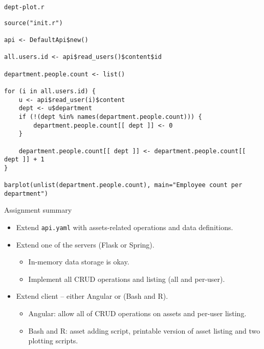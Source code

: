 \begin{frame}[fragile]{\texttt{dept-plot.r}}
\begin{lstlisting}[style=mini]
source("init.r")

api <- DefaultApi$new()

all.users.id <- api$read_users()$content$id

department.people.count <- list()

for (i in all.users.id) {
    u <- api$read_user(i)$content
    dept <- u$department
    if (!(dept %in% names(department.people.count))) {
        department.people.count[[ dept ]] <- 0
    }
    
    department.people.count[[ dept ]] <- department.people.count[[ dept ]] + 1
}

barplot(unlist(department.people.count), main="Employee count per department")
\end{lstlisting}
\end{frame}


\begin{frame}{Assignment summary}
    \begin{itemize}
        \item Extend \texttt{api.yaml} with assets-related operations
            and data definitions.
        \item Extend one of the servers (Flask or Spring).
            \begin{itemize}
                \item In-memory data storage is okay.
                \item Implement all CRUD operations and listing
                    (all and per-user).
            \end{itemize}
        \item Extend client -- either Angular or (Bash and R).
            \begin{itemize}
                \item Angular: allow all of CRUD operations on assets
                    and per-user listing.
                \item Bash and R: asset adding script, printable version
                    of asset listing and two plotting scripts.
            \end{itemize}
    \end{itemize}
\end{frame}
